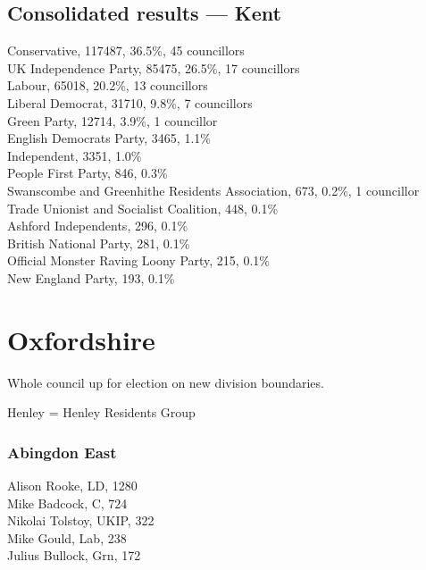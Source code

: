 \documentclass[a4paper,openany,10pt]{book}
\begin{document}
\subsection*{Consolidated results --- Kent}
Conservative, 117487, 36.5\%, 45 councillors\\
UK Independence Party, 85475, 26.5\%, 17 councillors\\
Labour, 65018, 20.2\%, 13 councillors\\
Liberal Democrat, 31710, 9.8\%, 7 councillors\\
Green Party, 12714, 3.9\%, 1 councillor\\
English Democrats Party, 3465, 1.1\% \\
Independent, 3351, 1.0\% \\
People First Party, 846, 0.3\% \\
Swanscombe and Greenhithe Residents Association, 673, 0.2\%, 1 councillor\\
Trade Unionist and Socialist Coalition, 448, 0.1\% \\
Ashford Independents, 296, 0.1\% \\
British National Party, 281, 0.1\% \\
Official Monster Raving Loony Party, 215, 0.1\% \\
New England Party, 193, 0.1\% \\


\vfill

\section{Oxfordshire}

Whole council up for election on new division boundaries.

Henley = Henley Residents Group



\subsubsection*{Abingdon East}



Alison Rooke, LD, 1280\\
Mike Badcock, C, 724\\
Nikolai Tolstoy, UKIP, 322\\
Mike Gould, Lab, 238\\
Julius Bullock, Grn, 172\\
\end{document}
